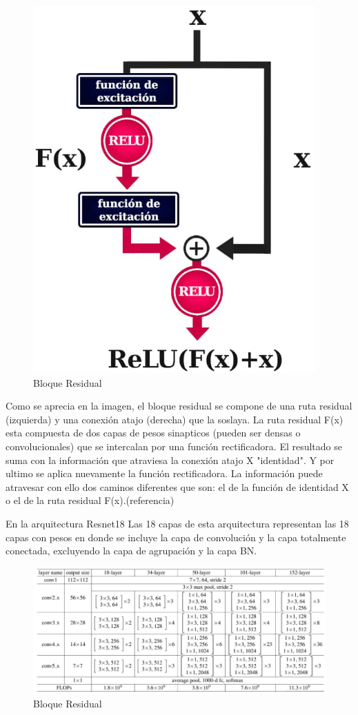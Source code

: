 				\begin{figure}[ht]
					\centering
					\includegraphics[scale=0.6]{Figs/67.png}
					\caption{Bloque Residual}
					\label{fig:Bloque Residual}
				\end{figure}
			
				Como se aprecia en la imagen, el bloque residual se compone de una ruta residual (izquierda) y una conexión atajo (derecha) que la soslaya. La ruta residual F(x) esta compuesta de dos capas de pesos sinapticos (pueden ser densas o convolucionales) que se intercalan por una función rectificadora. El resultado se suma con la información que atraviesa la conexión atajo X "identidad". Y por ultimo se aplica nuevamente la función rectificadora. La información puede atravesar con ello dos caminos diferentes que son: el de la función de identidad X o el de la ruta residual F(x).(referencia)

\newpage

				En la arquitectura Resnet18 Las 18 capas de esta arquitectura representan las 18 capas con pesos en donde se incluye la capa de convolución y la capa totalmente conectada, excluyendo la capa de agrupación y la capa BN.
				
				\begin{figure}[ht]
					\centering
					\includegraphics[scale=0.65]{Figs/68.png}
					\caption{Bloque Residual}
					\label{fig:Bloque Residual}
				\end{figure}
				
